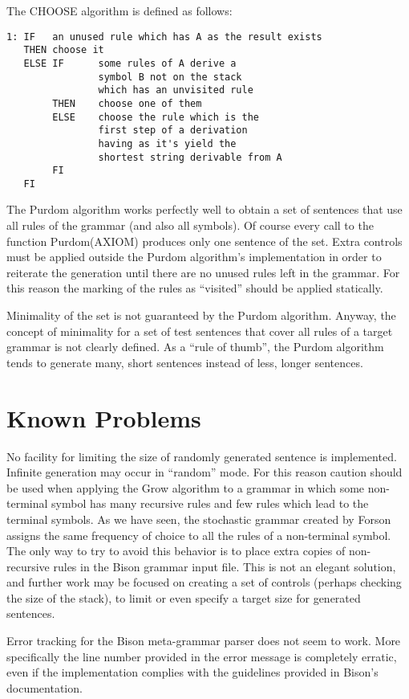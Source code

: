 \documentclass[a4paper,12pt]{article}
\begin{document}
\noindent
The CHOOSE algorithm is defined as follows:

\begin{verbatim}
1: IF   an unused rule which has A as the result exists
   THEN choose it
   ELSE IF      some rules of A derive a
                symbol B not on the stack
                which has an unvisited rule
        THEN    choose one of them
        ELSE    choose the rule which is the
                first step of a derivation
                having as it's yield the
                shortest string derivable from A
        FI
   FI
\end{verbatim}

\noindent
The Purdom algorithm works perfectly well to obtain a set of sentences that use all rules of the grammar (and also all symbols). Of course every call to the function Purdom(AXIOM) produces only one sentence of the set. Extra controls must be applied outside the Purdom algorithm's implementation in order to reiterate the generation until there are no unused rules left in the grammar. For this reason the marking of the rules as ``visited'' should be applied statically.

Minimality of the set is not guaranteed by the Purdom algorithm. Anyway, the concept of minimality for a set of test sentences that cover all rules of a target grammar is not clearly defined. As a ``rule of thumb'', the Purdom algorithm tends to generate many, short sentences instead of less, longer sentences.


\section{Known Problems}
No facility for limiting the size of randomly generated sentence is implemented. Infinite generation may occur in ``random'' mode. For this reason caution should be used when applying the Grow algorithm to a grammar in which some non-terminal symbol has many recursive rules and few rules which lead to the terminal symbols. As we have seen, the stochastic grammar created by Forson assigns the same frequency of choice to all the rules of a non-terminal symbol. The only way to try to avoid this behavior is to place extra copies of non-recursive rules in the Bison grammar input file. This is not an elegant solution, and further work may be focused on creating a set of controls (perhaps checking the size of the stack), to limit or even specify a target size for generated sentences.

Error tracking for the Bison meta-grammar parser does not seem to work. More specifically the line number provided in the error message is completely erratic, even if the implementation complies with the guidelines provided in Bison's documentation.
\end{document}
